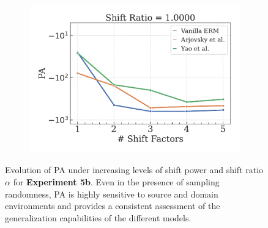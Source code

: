 \begin{figure}[H]
\begin{subfigure}[b]{0.32\textwidth}
        \includegraphics[width=\textwidth]{img/results_discussion/datashift/shift_ratio=1.000.pdf}
    \end{subfigure}



    \caption{
    Evolution of PA under increasing levels of shift power and shift ratio $\alpha$ for \textbf{Experiment 5b}. Even in the presence of
    sampling randomness, PA is highly sensitive to source and domain environments and provides
    a consistent assessment of the generalization capabilities of the different models. }
    
    \label{fig:pa_datashift_paired}
\end{figure}

